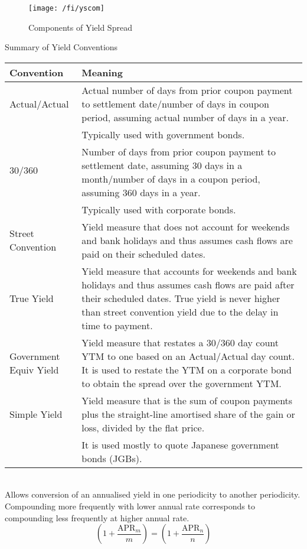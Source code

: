 \begin{figure}[H]
\centering
\texttt{[image: /fi/yscom]}
\caption{Components of Yield Spread}
\end{figure}

\begin{flushleft}
Summary of Yield Conventions
\begin{tabularx}{\textwidth}{p{11em}|X}
\hline
\rowcolor{gray!30}
Convention & Meaning \\
\hline
Actual$/$Actual & Actual number of days from prior coupon payment to settlement date/number of days in coupon period, assuming actual number of days in a year.\\
& Typically used with government bonds. \\
\hline
$30/360$ & Number of days from prior coupon payment to settlement date, assuming $30$ days in a month/number of days in a coupon period, assuming $360$ days in a year.\\
& Typically used with corporate bonds.\\
\hline
Street Convention & Yield measure that does not account for weekends and bank holidays and thus assumes cash flows are paid on their scheduled dates. \\
\hline
True Yield & Yield measure that accounts for weekends and bank holidays and thus assumes cash flows are paid after their scheduled dates. True yield is never higher than street convention yield due to the delay in time to payment.\\
\hline
Government Equiv Yield & Yield measure that restates a $30/360$ day count YTM to one based on an Actual$/$Actual day count. It is used to restate the YTM on a corporate bond to obtain the spread over the government YTM.\\
\hline
Simple Yield & Yield measure that is the sum of coupon payments plus the straight-line amortised share of the gain or loss, divided by the flat price.\\
& It is used mostly to quote Japanese government bonds (JGBs). \\
\hline
\end{tabularx}
\end{flushleft}

\begin{definition} \\
Allows conversion of an annualised yield in one periodicity to another periodicity. Compounding more frequently with lower annual rate corresponds to compounding less frequently at higher annual rate.
\begin{equation}
\left(1 + \frac{\text{APR}_m}{m} \right) = \left(1 + \frac{\text{APR}_n}{n} \right) \nonumber
\end{equation}
\end{definition}

